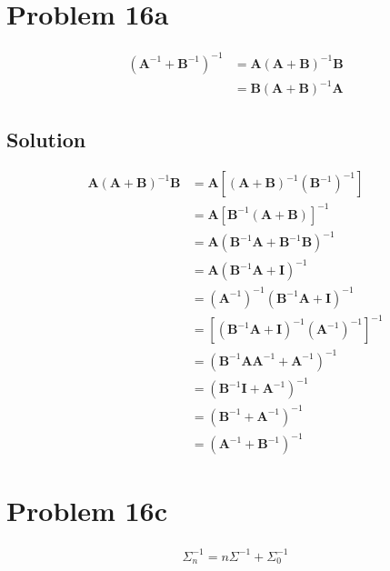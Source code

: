 \documentclass{IEEEtran}
\begin{document}
\newpage

\section{Problem 16a}
\begin{align*}
    \left(\textbf{A}^{-1} + \textbf{B}^{-1}\right)^{-1} &= \textbf{A} \left(\textbf{A} + \textbf{B}\right)^{-1}\textbf{B} \\
                                                        &= \textbf{B} \left(\textbf{A} + \textbf{B}\right)^{-1}\textbf{A}
\end{align*}

\subsection{Solution}
\begin{align*}
    \textbf{A} \left(\textbf{A} + \textbf{B}\right)^{-1}\textbf{B} &= \textbf{A} \left[\left(\textbf{A} + \textbf{B}\right)^{-1} \left(\textbf{B}^{-1}\right)^{-1}\right] \\
    &= \textbf{A} \left[\textbf{B}^{-1} \left(\textbf{A} + \textbf{B}\right)\right]^{-1} \\
    &= \textbf{A} \left(\textbf{B}^{-1}\textbf{A} + \textbf{B}^{-1}\textbf{B}\right)^{-1} \\
    &= \textbf{A} \left(\textbf{B}^{-1}\textbf{A} + \textbf{I}\right)^{-1} \\
    &= \left(\textbf{A}^{-1}\right)^{-1} \left(\textbf{B}^{-1}\textbf{A} + \textbf{I}\right)^{-1} \\
    &= \left[\left(\textbf{B}^{-1}\textbf{A} + \textbf{I}\right)^{-1} \left(\textbf{A}^{-1}\right)^{-1}\right]^{-1} \\
    &= \left(\textbf{B}^{-1}\textbf{A}\textbf{A}^{-1} + \textbf{A}^{-1}\right)^{-1} \\
    &= \left(\textbf{B}^{-1}\textbf{I} + \textbf{A}^{-1}\right)^{-1} \\
    &= \left(\textbf{B}^{-1} + \textbf{A}^{-1}\right)^{-1} \\
    &= \left(\textbf{A}^{-1} + \textbf{B}^{-1}\right)^{-1} 
\end{align*}

\newpage

\section{Problem 16c}
\begin{align}
    \tag{42} \Sigma_n^{-1} = n\Sigma^{-1} + \Sigma_0^{-1}
\end{align}
\end{document}
